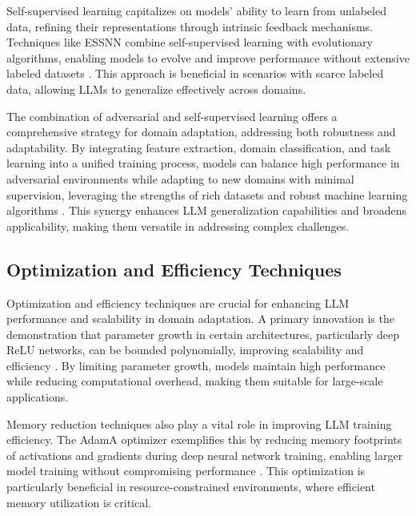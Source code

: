 Self-supervised learning capitalizes on models' ability to learn from unlabeled data, refining their representations through intrinsic feedback mechanisms. Techniques like ESSNN combine self-supervised learning with evolutionary algorithms, enabling models to evolve and improve performance without extensive labeled datasets \cite{le2019evolvingselfsupervisedneuralnetworks}. This approach is beneficial in scenarios with scarce labeled data, allowing LLMs to generalize effectively across domains.

The combination of adversarial and self-supervised learning offers a comprehensive strategy for domain adaptation, addressing both robustness and adaptability. By integrating feature extraction, domain classification, and task learning into a unified training process, models can balance high performance in adversarial environments while adapting to new domains with minimal supervision, leveraging the strengths of rich datasets and robust machine learning algorithms \cite{zhao2017multiplesourcedomainadaptation}. This synergy enhances LLM generalization capabilities and broadens applicability, making them versatile in addressing complex challenges.


\subsection{Optimization and Efficiency Techniques} \label{subsec:Optimization and Efficiency Techniques}

Optimization and efficiency techniques are crucial for enhancing LLM performance and scalability in domain adaptation. A primary innovation is the demonstration that parameter growth in certain architectures, particularly deep ReLU networks, can be bounded polynomially, improving scalability and efficiency \cite{morina2024growthparametersapproximatingrelu}. By limiting parameter growth, models maintain high performance while reducing computational overhead, making them suitable for large-scale applications.

Memory reduction techniques also play a vital role in improving LLM training efficiency. The AdamA optimizer exemplifies this by reducing memory footprints of activations and gradients during deep neural network training, enabling larger model training without compromising performance \cite{zhang2023adamaccumulationreducememory}. This optimization is particularly beneficial in resource-constrained environments, where efficient memory utilization is critical.

